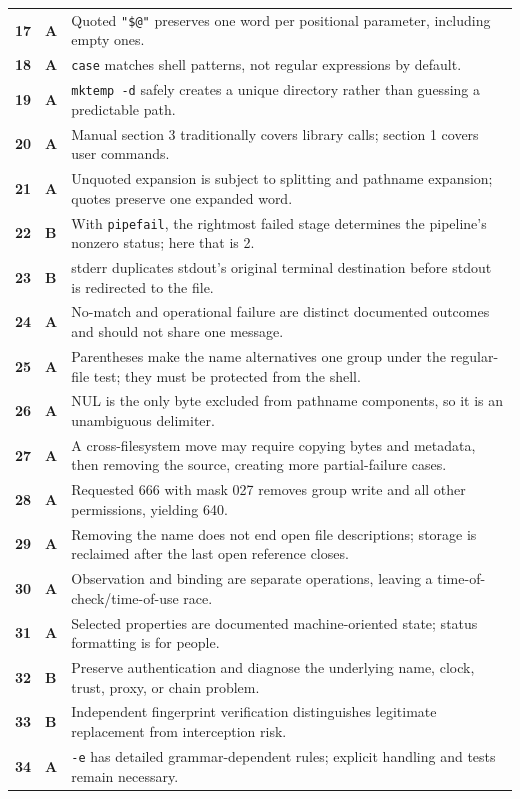 \documentclass[11pt,oneside,openany]{book}
\begin{document}
\begin{longtable}{>{\bfseries}p{}>{\bfseries\color{Blue}}p{}p{}}
17 & A & Quoted \texttt{"\$@"} preserves one word per positional parameter, including empty ones. \\
18 & A & \texttt{case} matches shell patterns, not regular expressions by default. \\
19 & A & \texttt{mktemp -d} safely creates a unique directory rather than guessing a predictable path. \\
20 & A & Manual section 3 traditionally covers library calls; section 1 covers user commands. \\
21 & A & Unquoted expansion is subject to splitting and pathname expansion; quotes preserve one expanded word. \\
22 & B & With \texttt{pipefail}, the rightmost failed stage determines the pipeline's nonzero status; here that is 2. \\
23 & B & stderr duplicates stdout's original terminal destination before stdout is redirected to the file. \\
24 & A & No-match and operational failure are distinct documented outcomes and should not share one message. \\
25 & A & Parentheses make the name alternatives one group under the regular-file test; they must be protected from the shell. \\
26 & A & NUL is the only byte excluded from pathname components, so it is an unambiguous delimiter. \\
27 & A & A cross-filesystem move may require copying bytes and metadata, then removing the source, creating more partial-failure cases. \\
28 & A & Requested 666 with mask 027 removes group write and all other permissions, yielding 640. \\
29 & A & Removing the name does not end open file descriptions; storage is reclaimed after the last open reference closes. \\
30 & A & Observation and binding are separate operations, leaving a time-of-check/time-of-use race. \\
31 & A & Selected properties are documented machine-oriented state; status formatting is for people. \\
32 & B & Preserve authentication and diagnose the underlying name, clock, trust, proxy, or chain problem. \\
33 & B & Independent fingerprint verification distinguishes legitimate replacement from interception risk. \\
34 & A & \texttt{-e} has detailed grammar-dependent rules; explicit handling and tests remain necessary. \\

\end{longtable}
\end{document}
